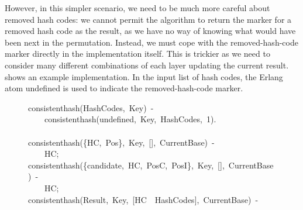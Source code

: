 \documentclass[runningheads,a4paper]{llncs}
\newcommand{\hlstd}[1]{\textcolor[rgb]{0,0,0}{#1}}
\newcommand{\hlnum}[1]{\textcolor[rgb]{0.69,0.49,0}{#1}}
\newcommand{\hlopt}[1]{\textcolor[rgb]{0,0,0}{#1}}
\newcommand{\hlkwd}[1]{\textcolor[rgb]{0,0,0.51}{#1}}
\begin{document}
However, in this simpler scenario, we need to be much more careful
about removed hash codes: we cannot permit the algorithm to return the
marker for a removed hash code as the result, as we have no way of
knowing what would have been next in the permutation. Instead, we must
cope with the removed-hash-code marker directly in the implementation
itself. This is trickier as we need to consider many different
combinations of each layer updating the current result.
 shows an example
implementation. In the input list of hash codes, the Erlang atom
{\ttfamily\hlstd{undefined}\normalfont} is used to indicate the
removed-hash-code marker.

\begin{figure}
\noindent
\ttfamily
\hlkwd{consistent\textunderscore hash}\hlstd{}\hlopt{(}\hlstd{HashCodes}\hlopt{,\ }\hlstd{Key}\hlopt{)\ {-}}\hspace*{\fill}\\
\hlstd{}\hlstd{\ \ \ \ }\hlstd{}\hlkwd{consistent\textunderscore hash}\hlstd{}\hlopt{(}\hlstd{undefined}\hlopt{,\ }\hlstd{Key}\hlopt{,\ }\hlstd{HashCodes}\hlopt{,\ }\hlstd{}\hlnum{1}\hlstd{}\hlopt{).}\hspace*{\fill}\\
\hlstd{}\hspace*{\fill}\\
\hlkwd{consistent\textunderscore hash}\hlstd{}\hlopt{(\{}\hlstd{HC}\hlopt{,\ }\hlstd{\textunderscore Pos}\hlopt{\},\ }\hlstd{\textunderscore Key}\hlopt{,\ {[}{]},\ }\hlstd{\textunderscore CurrentBase}\hlopt{)\ {-}}\hspace*{\fill}\\
\hlstd{}\hlstd{\ \ \ \ }\hlstd{HC}\hlopt{;}\hspace*{\fill}\\
\hlstd{}\hlkwd{consistent\textunderscore hash}\hlstd{}\hlopt{(\{}\hlstd{candidate}\hlopt{,\ }\hlstd{HC}\hlopt{,\ }\hlstd{\textunderscore PosC}\hlopt{,\ }\hlstd{\textunderscore PosI}\hlopt{\},\ }\hlstd{\textunderscore Key}\hlopt{,\ {[}{]},\ }\hlstd{\textunderscore CurrentBase}\hlopt{)\ {-}}\hspace*{\fill}\\
\hlstd{}\hlstd{\ \ \ \ }\hlstd{HC}\hlopt{;}\hspace*{\fill}\\
\hlstd{}\hlkwd{consistent\textunderscore hash}\hlstd{}\hlopt{(}\hlstd{Result}\hlopt{,\ }\hlstd{Key}\hlopt{,\ {[}}\hlstd{HC\ \textbar \ HashCodes}\hlopt{{]},\ }\hlstd{CurrentBase}\hlopt{)\ {-}}\hspace*{\fill}\\

\end{figure}
\end{document}
